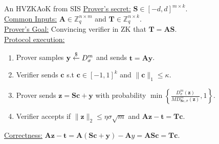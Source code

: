 \begin{frame}{An HVZKAoK from SIS}
	\underline{Prover's secret:} $\mathbf{S} \in [-d, d]^{m\times k}$.\\
	
	\underline{Common Inputs:} $\mathbf{A} \in \mathbb{Z}_q^{n \times m}$ and $\mathbf{T} \in \mathbb{Z}_q^{n\times k}$.\\
	
	\underline{Prover's Goal:} Convincing verifier in ZK that $\mathbf{T} = \mathbf{A}\mathbf{S}$.\\
	
	\underline{Protocol execution:}
	\begin{enumerate}
		\item Prover samples $\mathbf{y} \stackrel{\$}{\leftarrow} D^m_\sigma$ and sends $\mathbf{t} = \mathbf{A}\mathbf{y}$.
		\item Verifier sends $\mathbf{c}$ s.t $\mathbf{c} \in [-1, 1]^k$ and $\lVert \mathbf{c} \rVert_1 \leq \kappa$.
		\item Prover sends $\mathbf{z} = \mathbf{S}\mathbf{c} + \mathbf{y}$ with probability $\min\left\{\frac{D^m_\sigma(\mathbf{z})}{MD^m_{\mathbf{S}\mathbf{c},\sigma}(\mathbf{z})},1\right\}$.
		\item[] Verifier accepts if $\lVert\mathbf{z}\rVert_2 \leq \eta\sigma\sqrt{m}$ and $\mathbf{A}\mathbf{z} - \mathbf{t} = \mathbf{T}\mathbf{c}$.
	\end{enumerate}

	\underline{Correctness:} $\mathbf{A}\mathbf{z} - \mathbf{t} = \mathbf{A}(\mathbf{S}\mathbf{c}+\mathbf{y}) - \mathbf{A}{y} = \mathbf{A}\mathbf{S}\mathbf{c} = \mathbf{T}\mathbf{c}$.
\end{frame}